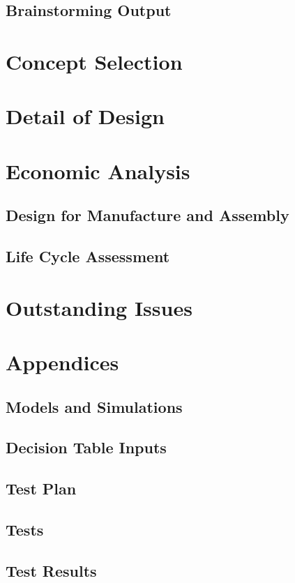 \documentclass{article}
\begin{document}
\subsection{Brainstorming Output}


\section{Concept Selection}


\section{Detail of Design}


\section{Economic Analysis}
\subsection{Design for Manufacture and Assembly}

\subsection{Life Cycle Assessment}


\section{Outstanding Issues}

\section{Appendices}
\subsection{Models and Simulations}
\subsection{Decision Table Inputs}
\subsection{Test Plan}

\subsection{Tests}

\subsection{Test Results}
\end{document}
